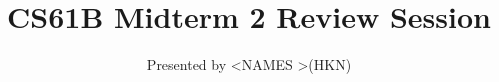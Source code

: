 

\title{CS61B Midterm 2 Review Session}
\author{Presented by \textless NAMES \textgreater (HKN)}
\date{}

\newcommand{\SlideAccessingLogistics}{@\#}









